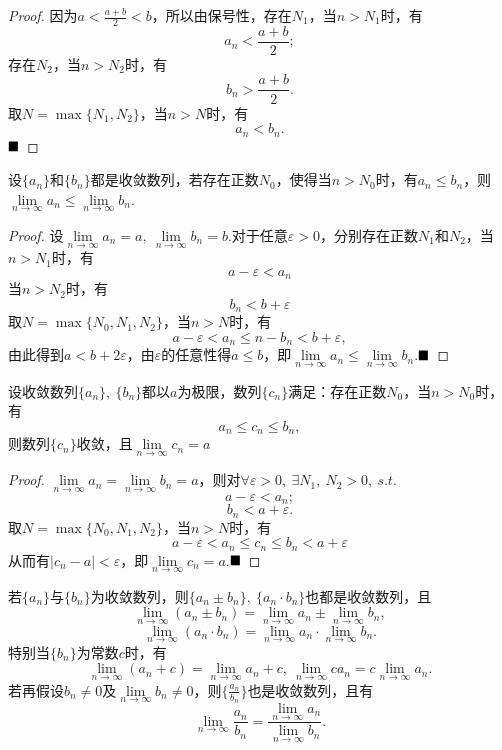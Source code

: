 \begin{proof}
	因为$a<\frac{a+b}{2}<b$，所以由保号性，存在$N_1$，当$n>N_1$时，有$$a_n<\frac{a+b}{2};$$存在$N_2$，当$n>N_2$时，有$$b_n>\frac{a+b}{2}.$$取$N=\max\{N_1,N_2\}$，当$n>N$时，有$$a_n<b_n.$$$\hfill\blacksquare$
\end{proof}
\begin{theorem}[保序性]
	设$\{a_n\}$和$\{b_n\}$都是收敛数列，若存在正数$N_0$，使得当$n>N_0$时，有$a_n\leqslant b_n$，则$\lim\limits_{n\to\infty}a_n\leqslant \lim\limits_{n\to\infty}b_n$.
\end{theorem}
\begin{proof}
	设$\lim\limits_{n\to\infty}a_n=a,\ \lim\limits_{n\to\infty}b_n=b$.对于任意$\varepsilon>0$，分别存在正数$N_1$和$N_2$，当$n>N_1$时，有$$a-\varepsilon<a_n$$
	当$n>N_2$时，有$$b_n<b+\varepsilon$$
	取$N=\max\{N_0,N_1,N_2\}$，当$n>N$时，有$$a-\varepsilon<a_n\leqslant n-b_n<b+\varepsilon,$$由此得到$a<b+2\varepsilon$，由$\varepsilon$的任意性得$a\leqslant b$，即$\lim\limits_{n\to\infty}a_n\leqslant \lim\limits_{n\to\infty}b_n$.$\hfill\blacksquare$
\end{proof}
\begin{theorem}[迫敛性]
	设收敛数列$\{a_n\},\ \{b_n\}$都以$a$为极限，数列$\{c_n\}$满足：存在正数$N_0$，当$n>N_0$时，有$$a_n\leqslant c_n\leqslant b_n,$$则数列$\{c_n\}$收敛，且$\lim\limits_{n\to\infty}c_n=a$
\end{theorem}
\begin{proof}
	$\lim\limits_{n\to\infty}a_n=\lim\limits_{n\to\infty}b_n=a$，则对$\forall\varepsilon>0,\ \exists N_1,\ N_2>0,\ s.t.$
	$$a-\varepsilon<a_n;$$
	$$b_n<a+\varepsilon.$$
	取$N=\max\{N_0,N_1,N_2\}$，当$n>N$时，有
	$$a-\varepsilon	<a_n\leqslant c_n\leqslant b_n<a+\varepsilon$$
	从而有$|c_n-a|<\varepsilon$，即$\lim\limits_{n\to\infty}c_n=a.$$\hfill\blacksquare$
\end{proof}
\begin{theorem}[四则运算法则]
	若$\{a_n\}$与$\{b_n\}$为收敛数列，则$\{a_n\pm b_n\},\ \{a_n\cdot b_n\}$也都是收敛数列，且$$\lim\limits_{n\to\infty}(a_n\pm b_n)=\lim\limits_{n\to\infty}a_n\pm \lim\limits_{n\to\infty}b_n,$$
	$$\lim\limits_{n\to\infty}(a_n\cdot b_n)=\lim\limits_{n\to\infty}a_n\cdot \lim\limits_{n\to\infty}b_n.$$
	特别当$\{b_n\}$为常数$c$时，有
	$$\lim\limits_{n\to\infty}(a_n+c)=\lim\limits_{n\to\infty}a_n+c,\ \lim\limits_{n\to\infty}ca_n=c\lim\limits_{n\to\infty}a_n.$$
	若再假设$b_n\neq 0$及$\lim\limits_{n\to\infty}b_n\neq 0$，则$\{\frac{a_n}{b_n}\}$也是收敛数列，且有
	$$\lim\limits_{n\to\infty}\frac{a_n}{b_n}=\frac{\lim\limits_{n\to\infty}a_n}{\lim\limits_{n\to\infty}b_n}.$$
\end{theorem}
